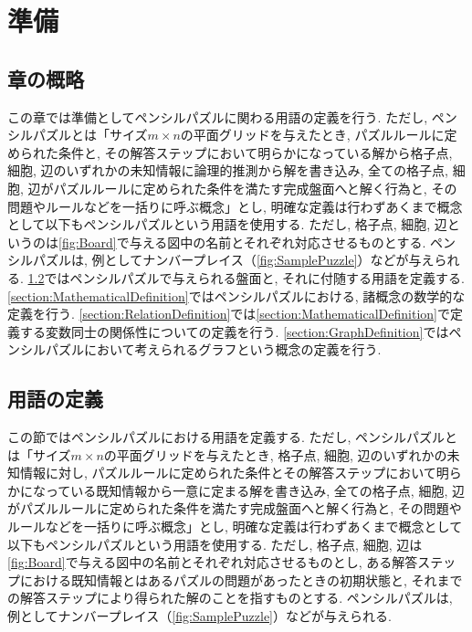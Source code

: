 \chapter{準備}\label{chapter:Prepare}
\section{章の概略}\label{section:Outline}
この章では準備としてペンシルパズルに関わる用語の定義を行う. ただし, ペンシルパズルとは「サイズ$m\times n$の平面グリッドを与えたとき, パズルルールに定められた条件と, その解答ステップにおいて明らかになっている解から格子点, 細胞, 辺のいずれかの未知情報に論理的推測から解を書き込み, 全ての格子点, 細胞, 辺がパズルルールに定められた条件を満たす完成盤面へと解く行為と, その問題やルールなどを一括りに呼ぶ概念」とし, 明確な定義は行わずあくまで概念として以下もペンシルパズルという用語を使用する. ただし, 格子点, 細胞, 辺というのは\cref{fig:Board}で与える図中の名前とそれぞれ対応させるものとする.
ペンシルパズルは, 例としてナンバープレイス（\cref{fig:SamplePuzzle}）などが与えられる.
\cref{section:WordDefinition}ではペンシルパズルで与えられる盤面と, それに付随する用語を定義する.
\cref{section:MathematicalDefinition}ではペンシルパズルにおける, 諸概念の数学的な定義を行う.
\cref{section:RelationDefinition}では\cref{section:MathematicalDefinition}で定義する変数同士の関係性についての定義を行う.
\cref{section:GraphDefinition}ではペンシルパズルにおいて考えられるグラフという概念の定義を行う.

\section{用語の定義}\label{section:WordDefinition}
この節ではペンシルパズルにおける用語を定義する. ただし, ペンシルパズルとは「サイズ$m\times n$の平面グリッドを与えたとき, 格子点, 細胞, 辺のいずれかの未知情報に対し, パズルルールに定められた条件とその解答ステップにおいて明らかになっている既知情報から一意に定まる解を書き込み, 全ての格子点, 細胞, 辺がパズルルールに定められた条件を満たす完成盤面へと解く行為と, その問題やルールなどを一括りに呼ぶ概念」とし, 明確な定義は行わずあくまで概念として以下もペンシルパズルという用語を使用する. ただし, 格子点, 細胞, 辺は\cref{fig:Board}で与える図中の名前とそれぞれ対応させるものとし, ある解答ステップにおける既知情報とはあるパズルの問題があったときの初期状態と, それまでの解答ステップにより得られた解のことを指すものとする. ペンシルパズルは, 例としてナンバープレイス（\cref{fig:SamplePuzzle}）などが与えられる.


